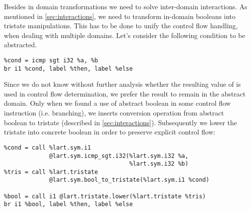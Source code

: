 
Besides in domain transformations we need to solve inter-domain interactions. As
mentioned in \autoref{sec:interactions}, we need to transform in-domain booleans
into tristate manipulations. This has to be done to unify the control flow
handling, when dealing with multiple domains. Let's consider the following condition
to be abstracted.
\begin{verbatim}
%cond = icmp sgt i32 %a, %b
br i1 %cond, label %then, label %else
\end{verbatim}
Since we do not know without further analysis whether the resulting value of
 is used in control flow determination, we prefer the result to
remain in the abstract domain. Only when we found a use of abstract boolean in
some control flow instruction (i.e. branching), we inserts conversion operation
from abstract boolean to tristate (described in \autoref{sec:interactions}).
Subsequently we lower the tristate into concrete boolean in order to preserve
explicit control flow:
\begin{verbatim}
%cond = call %lart.sym.i1
             @lart.sym.icmp_sgt.i32(%lart.sym.i32 %a,
                                    %lart.sym.i32 %b)
%tris = call %lart.tristate
             @lart.sym.bool_to_tristate(%lart.sym.i1 %cond)

%bool = call i1 @lart.tristate.lower(%lart.tristate %tris)
br i1 %bool, label %then, label %else
\end{verbatim}

